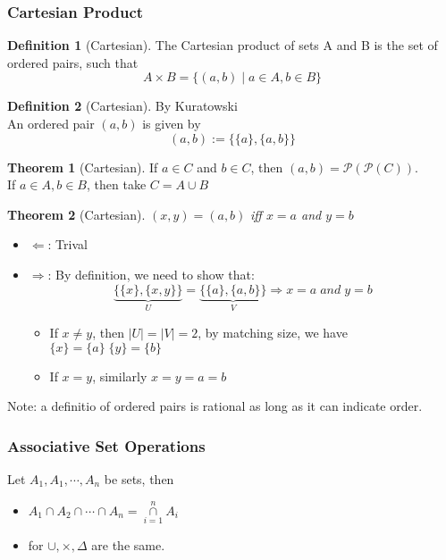 \documentclass{article}
\theoremstyle{definition}
\newtheorem{definition}{Definition}[subsection]
\newtheorem{theorem}{Theorem}
\begin{document}
\subsubsection{Cartesian Product}
\begin{definition}[Cartesian]
    The Cartesian product of sets A and B is the set of ordered pairs, such that
    \begin{equation}
        A \times B = \{ (a,b) \mid a \in A, b \in B \}
    \end{equation}
\end{definition}
\begin{definition}[Cartesian]
    By Kuratowski\\
    An ordered pair $(a,b)$ is given by
    \begin{equation}
        (a,b):=\{ \{a\}, \{a,b\} \}
    \end{equation}
\end{definition}
\begin{theorem}[Cartesian]
    If $a \in C$ and $b \in C$, then $(a,b) = \mathcal{P}(\mathcal{P}(C))$.\\
    If $a \in A, b \in B$, then take $C = A \cup B$
\end{theorem}
\begin{theorem}[Cartesian]
    $(x,y)=(a,b)$ \it{iff} $x=a$ and $y=b$
\end{theorem}
\begin{itemize}
    \item $\Leftarrow$: Trival
    \item $\Rightarrow$: By definition, we need to show that:
       \begin{equation}
           \underbrace{\{\{x\},\{x,y\}\}}_{{}U} = \underbrace{\{\{a\},\{a,b\}\}}_{{}V} \Rightarrow x=a\; and\; y=b
       \end{equation} 
       \begin{itemize}
           \item If $x \neq y$, then $\lvert U \rvert  = \lvert V\rvert = 2$, by matching size, we have $\{x\}=\{a\} \; \{y\}=\{b\}$
           \item If $x=y$, similarly $x=y=a=b$
       \end{itemize}
\end{itemize}
Note: a definitio of ordered pairs is rational as long as it can indicate order.
\subsubsection{Associative Set Operations}
Let $A_1,A_1,\dotsm,A_n$ be sets, then
\begin{itemize}
    \item $A_1 \cap A_2 \cap \dotsm \cap A_n = \mathop{\cap}\limits_{i=1}^{n}A_i$
    \item for $\cup,\times,\Delta$ are the same.
\end{itemize}
\end{document}
